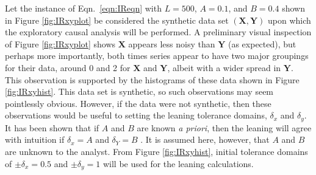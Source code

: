 Let the instance of Eqn.\ \ref{eqn:IReqn} with $L=500$, $A=0.1$, and $B=0.4$ shown in Figure \ref{fig:IRxyplot} be considered the synthetic data set $(\mathbf{X},\mathbf{Y})$ upon which the exploratory causal analysis will be performed.  A preliminary visual inspection of Figure \ref{fig:IRxyplot} shows $\mathbf{X}$ appears less noisy than $\mathbf{Y}$ (as expected), but perhaps more importantly, both times series appear to have two major groupings for their data, around 0 and 2 for $\mathbf{X}$ and $\mathbf{Y}$, albeit with a wider spread in $\mathbf{Y}$.  This observation is supported by the histograms of these data shown in Figure \ref{fig:IRxyhist}.  This data set is synthetic, so such observations may seem pointlessly obvious.  However, if the data were not synthetic, then these observations would be useful to setting the leaning tolerance domains, $\delta_x$ and $\delta_y$.  It has been shown that if $A$ and $B$ are known {\em a priori}, then the leaning will agree with intuition if $\delta_x=A$ and $\delta_Y=B$ \cite{Weigel2014}.  It is assumed here, however, that $A$ and $B$ are unknown to the analyst.  From Figure \ref{fig:IRxyhist}, initial tolerance domains of $\pm\delta_x = 0.5$ and $\pm\delta_y=1$ will be used for the leaning calculations.  
